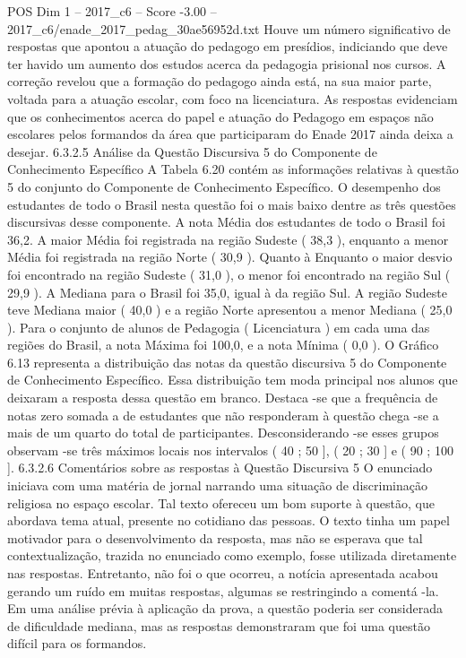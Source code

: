 \begin{textsample}{POS Dim 1 – 2017\_c6 – Score -3.00 – 2017\_c6/enade\_2017\_pedag\_30ae56952d.txt}
Houve um número significativo de respostas que apontou a atuação do pedagogo em presídios, indiciando que deve ter havido um aumento dos estudos acerca da pedagogia prisional nos cursos.
A correção revelou que a formação do pedagogo ainda está, na sua maior parte, voltada para a atuação escolar, com foco na licenciatura.
As respostas evidenciam que os conhecimentos acerca do papel e atuação do Pedagogo em espaços não escolares pelos formandos da área que participaram do Enade 2017 ainda deixa a desejar. 6.3.2.5 Análise da Questão Discursiva 5 do Componente de Conhecimento Específico A Tabela 6.20 contém as informações relativas à questão 5 do conjunto do Componente de Conhecimento Específico.
O desempenho dos estudantes de todo o Brasil nesta questão foi o mais baixo dentre as três questões discursivas desse componente.
A nota Média dos estudantes de todo o Brasil foi 36,2.
A maior Média foi registrada na região Sudeste ( 38,3 ), enquanto a menor Média foi registrada na região Norte ( 30,9 ).
Quanto à Enquanto o maior desvio foi encontrado na região Sudeste ( 31,0 ), o menor foi encontrado na região Sul ( 29,9 ).
A Mediana para o Brasil foi 35,0, igual à da região Sul.
A região Sudeste teve Mediana maior ( 40,0 ) e a região Norte apresentou a menor Mediana ( 25,0 ).
Para o conjunto de alunos de Pedagogia ( Licenciatura ) em cada uma das regiões do Brasil, a nota Máxima foi 100,0, e a nota Mínima ( 0,0 ).
O Gráfico 6.13 representa a distribuição das notas da questão discursiva 5 do Componente de Conhecimento Específico.
Essa distribuição tem moda principal nos alunos que deixaram a resposta dessa questão em branco.
Destaca -se que a frequência de notas zero somada a de estudantes que não responderam à questão chega -se a mais de um quarto do total de participantes.
Desconsiderando -se esses grupos observam -se três máximos locais nos intervalos ( 40 ; 50 ], ( 20 ; 30 ] e ( 90 ; 100 ]. 6.3.2.6 Comentários sobre as respostas à Questão Discursiva 5 O enunciado iniciava com uma matéria de jornal narrando uma situação de discriminação religiosa no espaço escolar.
Tal texto ofereceu um bom suporte à questão, que abordava tema atual, presente no cotidiano das pessoas.
O texto tinha um papel motivador para o desenvolvimento da resposta, mas não se esperava que tal contextualização, trazida no enunciado como exemplo, fosse utilizada diretamente nas respostas.
Entretanto, não foi o que ocorreu, a notícia apresentada acabou gerando um ruído em muitas respostas, algumas se restringindo a comentá -la.
Em uma análise prévia à aplicação da prova, a questão poderia ser considerada de dificuldade mediana, mas as respostas demonstraram que foi uma questão difícil para os formandos.

\end{textsample}
